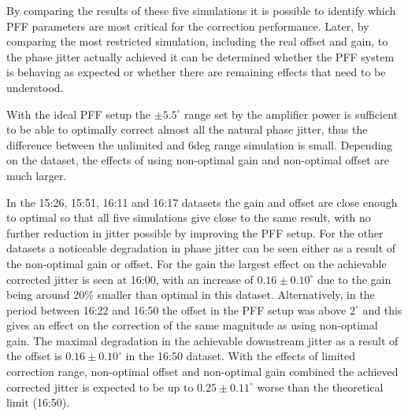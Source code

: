 By comparing the results of these five simulations it is possible to identify which PFF parameters are most critical for the correction performance. Later, by comparing the most restricted simulation, including the real offset and gain, to the phase jitter actually achieved it can be determined whether the PFF system is behaving as expected or whether there are remaining effects that need to be understood.

With the ideal PFF setup the \(\pm5.5^\circ\) range set by the amplifier power is sufficient to be able to optimally correct almost all the natural phase jitter, thus the difference between the unlimited and 6deg range simulation is small. Depending on the dataset, the effects of using non-optimal gain and non-optimal offset are much larger.

%

In the 15:26, 15:51, 16:11 and 16:17 datasets the gain and offset are close enough to optimal so that all five simulations give close to the same result, with no further reduction in jitter possible by improving the PFF setup. 
For the other datasets a noticeable degradation in phase jitter can be seen either as a result of the non-optimal gain or offset.
For the gain the largest effect on the achievable corrected jitter is seen at 16:00, with an increase of \(0.16\pm0.10^\circ\) due to the gain being around 20\% smaller than optimal in this dataset. 
Alternatively, in the period between 16:22 and 16:50 the offset in the PFF setup was above \(2^\circ\) and this gives an effect on the correction of the same magnitude as using non-optimal gain. The maximal degradation in the achievable downstream jitter as a result of the offset is \(0.16\pm0.10^\circ\) in the 16:50 dataset. 
With the effects of limited correction range, non-optimal offset and non-optimal gain combined the achieved corrected jitter is expected to be up to \(0.25\pm0.11^\circ\) worse than the theoretical limit (16:50).%


